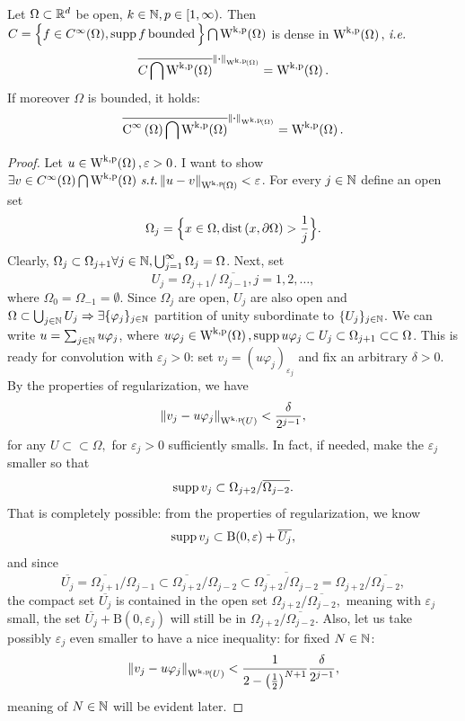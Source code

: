\documentclass{article}
\begin{document}
\begin{theorem}
	Let $\Omega \subset {\mathbb R}^d$ be open, $k \in {\mathbb N}, p \in [1,\infty).$ Then $C = \Big\{ f \in C^\infty(\Omega), \supp f \, \text{bounded} \,\Big\} \bigcap \WkpSet{\Omega}$ is dense in $\WkpSet{\Omega}, \, \text{\textit{i.e.}} \,$
	\[
		\overline{C \bigcap \WkpSet{\Omega}}^{\norm{\vdot}_{\WkpSet{\Omega}}} = \WkpSet{\Omega}.
	\]
	If moreover $\Omega$ is bounded, it holds:
	\[
		\overline{\CinfSet{\Omega}\bigcap \WkpSet{\Omega}}^{\norm{\vdot}_{\WkpSet{\Omega}}} = \WkpSet{\Omega}.
	\]
\end{theorem}
\begin{proof}
	Let $u \in \WkpSet{\Omega}, \varepsilon >0$. I want to show $\exists v \in C^\infty(\Omega) \bigcap \WkpSet{\Omega} \, \text{\textit{s.t.}} \, \norm{u-v}_{\WkpSet{\Omega}} < \varepsilon$.
For every $j \in {\mathbb N}$ define an open set
	\[
		\Omega_j = \Big\{ x \in \Omega, \operatorname{dist}\qty(x,\partial \Omega) > \frac{1}{j}\Big\}.
	\]
	Clearly, $\Omega_j \subset \Omega_{j+1} \forall j \in {\mathbb N}, \bigcup_{j=1}^\infty \Omega_j =\Omega$. Next, set
	\[
		U_j = \Omega_{j+1} /\,  \overline{\Omega_{j-1}}, j=1,2, \dots,
	\]
	where $\Omega_0 = \Omega_{-1} = \emptyset$. Since $\Omega_j$ are open, $U_j$ are also open and $\Omega \subset \bigcup_{j \in {\mathbb N}}U_j  \Rightarrow \exists \{\varphi_j\}_{j\in {\mathbb N}} $ partition of unity subordinate to $\{U_j\}_{j \in {\mathbb N}}$. We can write $u = \sum_{j \in {\mathbb N}} u \varphi_j$, where $u \varphi_j \in \WkpSet{\Omega}, \supp u \varphi_j \subset U_j \subset \Omega_{j+1} \subset \subset \Omega$. This is ready for convolution with $\varepsilon_j >0$: set $ v_j = (u \varphi_j)_{\varepsilon_j}$ and fix an arbitrary $\delta>0.$ By the properties of regularization, we have
	\[
		\norm{v_j - u \varphi_j }_{\WkpSet{U}} < \frac{\delta}{2^{j-1}},
	\]
	for any $U \subset \subset \Omega,$ for $\varepsilon_j > 0$ sufficiently smalls. In fact, if needed, make the $\varepsilon_j$ smaller so that
	\[
		\operatorname{supp} v_j \subset \Omega_{j+2}/ \overline{\Omega_{j-2}}.
	\]
	That is completely possible: from the properties of regularization, we know
	\[
		\operatorname{supp} v_j \subset \text{B}(0,\varepsilon)+ \overline{U_j},
	\]
	and since
	\[
		\overline{U_j} = \overline{\Omega_{j+1}}/\Omega_{j-1} \subset \overline{\Omega_{j+2}}/\Omega_{j-2} \subset \overline{\overline{\Omega_{j+2}}/\Omega_{j-2}} = \Omega_{j+2}/ \overline{\Omega_{j-2}},
	\]
	the compact set $\overline{U_j}$ is contained in the open set $\Omega_{j+2}/ \overline{\Omega_{j-2}},$ meaning with $\varepsilon_j$ small, the set $\overline{U_j} + \text{B}(0,\varepsilon_j)$ will still be in $\Omega_{j+2}/ \overline{\Omega_{j-2}}.$ Also, let us take possibly $\varepsilon_j$ even smaller to have a nice inequality: for fixed $N \in {\mathbb N}$:
	\[
		\norm{v_j - u \varphi_j}_{\WkpSet{U}} < \frac{1}{2-\qty(\frac{1}{2})^{N+1}} \frac{\delta}{2^{j-1}},
	\]
	meaning of $N \in {\mathbb N}$ will be evident later. 



\end{proof}
\end{document}

